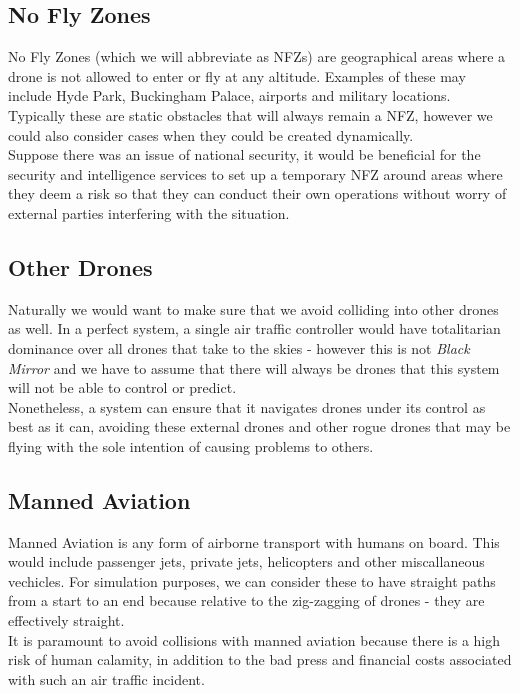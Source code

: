 \documentclass[a4paper,11pt,titlepage]{report}
\begin{document}
\subsection{No Fly Zones}
No Fly Zones (which we will abbreviate as NFZs) are geographical areas where a drone is not allowed to enter or fly at any altitude. Examples of these may include Hyde Park, Buckingham Palace, airports and military locations. Typically these are static obstacles that will always remain a NFZ, however we could also consider cases when they could be created dynamically.\\

Suppose there was an issue of national security, it would be beneficial for the security and intelligence services to set up a temporary NFZ around areas where they deem a risk so that they can conduct their own operations without worry of external parties interfering with the situation.

\subsection{Other Drones}
Naturally we would want to make sure that we avoid colliding into other drones as well. In a perfect system, a single air traffic controller would have totalitarian dominance over all drones that take to the skies - however this is not \textit{Black Mirror} and we have to assume that there will always be drones that this system will not be able to control or predict. \\

Nonetheless, a system can ensure that it navigates drones under its control as best as it can, avoiding these external drones and other rogue drones that may be flying with the sole intention of causing problems to others.

\clearpage
\subsection{Manned Aviation}
Manned Aviation is any form of airborne transport with humans on board. This would include passenger jets, private jets, helicopters and other miscallaneous vechicles. For simulation purposes, we can consider these to have straight paths from a start to an end because relative to the zig-zagging of drones - they are effectively straight.\\

It is paramount to avoid collisions with manned aviation because there is a high risk of human calamity, in addition to the bad press and financial costs associated with such an air traffic incident.
\end{document}
